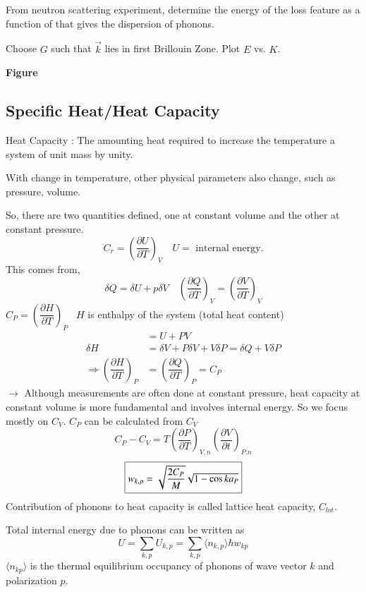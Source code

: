 \chapter{}\label{lec19}

From neutron scattering experiment, determine the energy of the loss feature as a function of  that gives the dispersion of phonons.

Choose $G$ such that $\overrightarrow{k}$ lies in first Brillouin Zone. Plot $E$ vs. $K$.
\begin{center}
{\bf Figure}
\end{center}

\section*{Specific Heat/Heat Capacity}

Heat Capacity : The amounting heat required to increase the temperature a system of unit mass by unity.

With change in temperature, other physical parameters also change, such as pressure, volume.

So, there are two quantities defined, one at constant volume and the other at constant pressure.
$$
C_{r}=\left(\dfrac{\partial U}{\partial T}\right)_{V}\quad U=\text{ internal energy.}
$$
This comes from,
$$
\delta Q=\delta U + p\delta V\quad \left(\dfrac{\partial Q}{\partial T}\right)_{V}=\left(\dfrac{\partial V}{\partial T}\right)_{V}
$$
$C_{P}=\left(\dfrac{\partial H}{\partial T}\right)_{P}$ \ $H$ is enthalpy of the system (total heat content)
\begin{align*}
&= U+PV\\
\delta H &= \delta V+P\delta V+V\delta P=\delta Q+V\delta P\\
\Rightarrow \left(\dfrac{\partial H}{\partial T}\right)_{P} &= \left(\dfrac{\partial Q}{\partial T}\right)_{P}=C_{P}
\end{align*}
$\to$ Although measurements are often done at constant pressure, heat capacity at constant volume is more fundamental and involves internal energy. So we focus mostly on $C_{V}$. $C_{P}$ can be calculated from $C_{V}$
$$
C_{P}-C_{V}=T\left(\dfrac{\partial P}{\partial T}\right)_{V,n}\left(\dfrac{\partial V}{\partial t}\right)_{P.n}
$$
$$
\fbox{$w_{k,p}=\sqrt{\dfrac{2C_{P}}{M}}\sqrt{1-\cos ka_{P}}$}
$$
Contribution of phonons to heat capacity is called lattice heat capacity, $C_{lot}$.

Total internal energy due to phonons can be written as
$$
U=\sum\limits_{k,p}U_{k,p}=\sum\limits_{k,p}\langle n_{k,p}\rangle \hbar w_{kp}
$$
$\langle n_{kp}\rangle$ is the thermal equilibrium occupancy of phonons of wave vector $k$ and polarization $p$.

